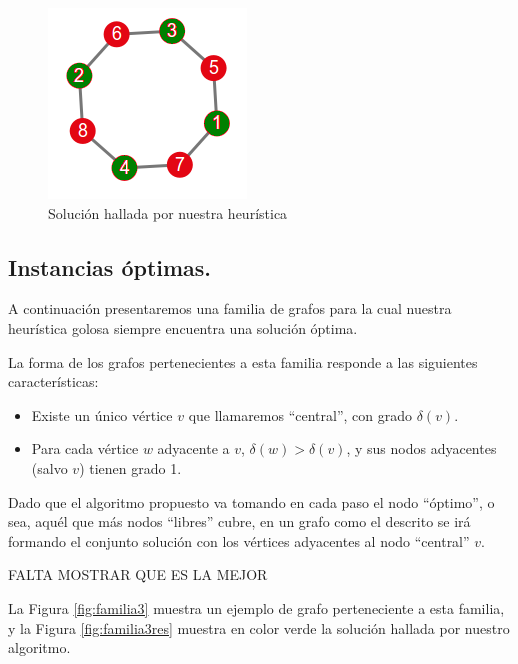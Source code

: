 \begin{figure}[!htb]
\begin{center}
  \includegraphics[scale=1.0]{imagenes/faimilia2rename-solnoopt.png}
\end{center}
  \caption{Solución hallada por nuestra heurística}\label{fig:familia2bisres}
\endminipage
\end{figure}



\vspace*{0.6cm}

\subsection{Instancias óptimas.}

\vspace*{0.3cm}

A continuación presentaremos una familia de grafos para la cual nuestra heurística golosa siempre encuentra una solución óptima.

La forma de los grafos pertenecientes a esta familia responde a las siguientes características:

\begin{itemize}
\item Existe un único vértice $v$ que llamaremos ``central'', con grado $\delta(v)$.
\item Para cada vértice $w$ adyacente a $v$, $\delta(w) > \delta(v)$, y sus nodos adyacentes (salvo $v$) tienen grado 1.	
\end{itemize}

Dado que el algoritmo propuesto va tomando en cada paso el nodo ``óptimo'', o sea, aquél que más nodos ``libres'' cubre, en un grafo como el descrito se irá formando el conjunto solución con los vértices adyacentes al nodo ``central'' $v$.  

FALTA MOSTRAR QUE ES LA MEJOR

La Figura \ref{fig:familia3} muestra un ejemplo de grafo perteneciente a esta familia, y la Figura \ref{fig:familia3res} muestra en color verde la solución hallada por nuestro algoritmo.


